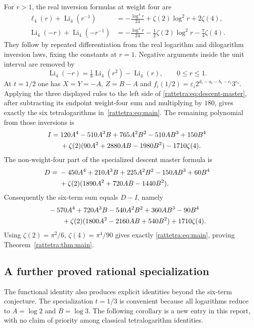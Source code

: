 For $r>1$, the real inversion formulas at weight four are
\begin{align*}
 \ell_4(r)+\operatorname{Li}_4(r^{-1})
   &=-\frac{\log^4r}{24}+\zeta(2)\log^2r+2\zeta(4),\\
 \operatorname{Li}_4(-r)+\operatorname{Li}_4(-r^{-1})
   &=-\frac{\log^4r}{24}-\frac12\zeta(2)\log^2r
       -\frac74\zeta(4).
\end{align*}
They follow by repeated differentiation from the real logarithm
and dilogarithm inversion laws, fixing the constants at $r=1$.
Negative arguments inside the unit interval are removed by
\[
 \operatorname{Li}_4(-r)=\tfrac18\operatorname{Li}_4(r^2)
                                  -\operatorname{Li}_4(r),
 \qquad 0\le r\le1.
\]
At $t=1/2$ one has $X=Y=-A$, $Z=B-A$ and
$f_i(1/2)=\varepsilon_i2^{d_i-a_i-b_i-c_i}3^{c_i}$.
Applying the three displayed rules to the left side of
\eqref{rattetra:eq:descent-master}, after subtracting its endpoint
weight-four sum and multiplying by $180$, gives exactly the six
tetralogarithms in~\eqref{rattetra:eq:main}. The remaining polynomial
from those inversions is
\begin{align*}
I={}&120A^4-510A^3B+765A^2B^2-510AB^3+150B^4\notag\\
 &+\zeta(2)(90A^2+2880AB-1980B^2)-1710\zeta(4).
\end{align*}
The non-weight-four part of the specialized descent master formula is
\begin{align*}
D={}&-450A^4+210A^3B+225A^2B^2-150AB^3+60B^4\notag\\
 &+\zeta(2)(1890A^2+720AB-1440B^2).
\end{align*}
Consequently the six-term sum equals $D-I$, namely
\begin{align*}
&-570A^4+720A^3B-540A^2B^2+360AB^3-90B^4\notag\\
&\qquad+\zeta(2)(1800A^2-2160AB+540B^2)+1710\zeta(4).
\end{align*}
Using $\zeta(2)=\pi^2/6$, $\zeta(4)=\pi^4/90$ gives exactly
\eqref{rattetra:eq:main}, proving Theorem~\ref{rattetra:thm:main}.

\subsection{A further proved rational specialization}
\label{rattetra:sec:onethird}

The functional identity also produces explicit identities beyond the
six-term conjecture. The specialization $t=1/3$ is convenient because
all logarithms reduce to $A=\log2$ and $B=\log3$. The following
corollary is a new entry in this report, with no claim of priority
among classical tetralogarithm identities.

